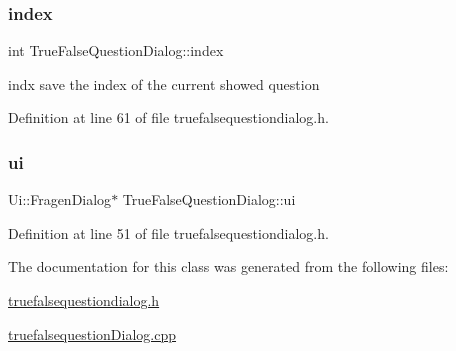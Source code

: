 \subsubsection{\texorpdfstring{index}{index}}
{\footnotesize\ttfamily int True\+False\+Question\+Dialog\+::index\hspace{0.3cm}{\ttfamily [private]}}



indx save the index of the current showed question 



Definition at line 61 of file truefalsequestiondialog.\+h.

\mbox{\label{class_true_false_question_dialog_a2432171c1d7d2f3a798389d9a4d464fc}} 
\subsubsection{\texorpdfstring{ui}{ui}}
{\footnotesize\ttfamily Ui\+::\+Fragen\+Dialog$\ast$ True\+False\+Question\+Dialog\+::ui\hspace{0.3cm}{\ttfamily [private]}}



Definition at line 51 of file truefalsequestiondialog.\+h.



The documentation for this class was generated from the following files\+:\begin{DoxyCompactItemize}
\item 
\mbox{\hyperlink{truefalsequestiondialog_8h}{truefalsequestiondialog.\+h}}\item 
\mbox{\hyperlink{truefalsequestion_dialog_8cpp}{truefalsequestion\+Dialog.\+cpp}}\end{DoxyCompactItemize}
